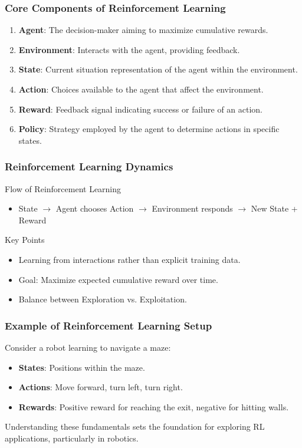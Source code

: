 \documentclass[aspectratio=169]{beamer}
\begin{document}
\begin{frame}[fragile]
    \frametitle{Core Components of Reinforcement Learning}
    \begin{enumerate}
        \item \textbf{Agent}: The decision-maker aiming to maximize cumulative rewards.
        \item \textbf{Environment}: Interacts with the agent, providing feedback.
        \item \textbf{State}: Current situation representation of the agent within the environment.
        \item \textbf{Action}: Choices available to the agent that affect the environment.
        \item \textbf{Reward}: Feedback signal indicating success or failure of an action.
        \item \textbf{Policy}: Strategy employed by the agent to determine actions in specific states.
    \end{enumerate}
\end{frame}

\begin{frame}[fragile]
    \frametitle{Reinforcement Learning Dynamics}
    \begin{block}{Flow of Reinforcement Learning}
        \begin{itemize}
            \item State $\rightarrow$ Agent chooses Action $\rightarrow$ Environment responds $\rightarrow$ New State + Reward
        \end{itemize}
    \end{block}

    \begin{block}{Key Points}
        \begin{itemize}
            \item Learning from interactions rather than explicit training data.
            \item Goal: Maximize expected cumulative reward over time.
            \item Balance between Exploration vs. Exploitation.
        \end{itemize}
    \end{block}
\end{frame}

\begin{frame}[fragile]
    \frametitle{Example of Reinforcement Learning Setup}
    Consider a robot learning to navigate a maze:
    \begin{itemize}
        \item \textbf{States}: Positions within the maze.
        \item \textbf{Actions}: Move forward, turn left, turn right.
        \item \textbf{Rewards}: Positive reward for reaching the exit, negative for hitting walls.
    \end{itemize}
    
    Understanding these fundamentals sets the foundation for exploring RL applications, particularly in robotics.
\end{frame}
\end{document}
